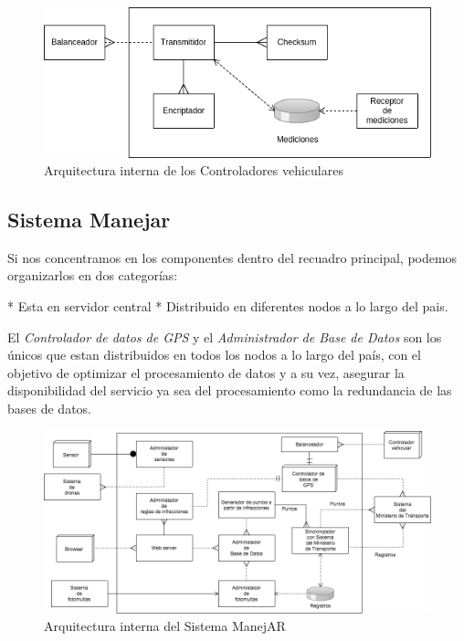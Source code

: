 \begin{figure}
\centerline{\includegraphics[width=1\textwidth]{./imagenes/arquitectura_tp2/controlador_vehicular.png}}
\caption{Arquitectura interna de los Controladores vehiculares}
\end{figure}


\subsection{Sistema Manejar}

Si nos concentramos en los componentes dentro del recuadro principal, podemos 
organizarlos en dos categorías:

* Esta en servidor central
* Distribuido en diferentes nodos a lo largo del pais.

El \textit{Controlador de datos de GPS} y el \textit{Administrador de Base de Datos} 
son los únicos que estan distribuidos en todos los nodos a lo largo del país, 
con el objetivo de optimizar el procesamiento de datos y a su vez, asegurar la 
disponibilidad del servicio ya sea del procesamiento como la redundancia de las bases de datos.


\begin{figure}
\centerline{\includegraphics[width=1\textwidth]{./imagenes/arquitectura_tp2/manejar.png}}
\caption{Arquitectura interna del Sistema ManejAR}
\end{figure}

